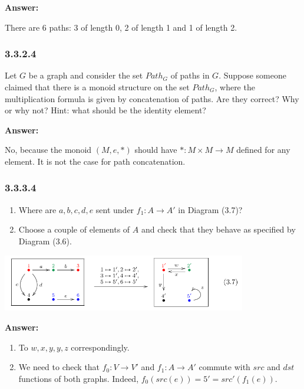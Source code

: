 \documentclass{article}
\newcommand{\vsp}[0]{\vspace*{10pt}\par}
\newcommand{\exercise}[1]{\subsubsection*{#1}}
\newcommand{\ans}[0]{\vsp\textbf{Answer: }\vsp}
\newcommand{\ei}{\item}
\newcommand{\es}{\begin{enumerate}[label=(\alph*)]\ei}
\newcommand{\ee}{\end{enumerate}}
\begin{document}
\ans

There are 6 paths: 3 of length 0, 2 of length 1 and 1 of length 2.

\exercise{3.3.2.4}

Let $G$ be a graph and consider the set $Path_G$ of paths in $G$. Suppose
someone claimed that there is a monoid structure on the set $Path_G$, where the
multiplication formula is given by concatenation of paths. Are they correct? Why
or why not? Hint: what should be the identity element?

\ans

No, because the monoid $(M,e,*)$ should have $*:M \times M\to M$ defined for any
element. It is not the case for path concatenation.

\exercise{3.3.3.4}

\es Where are $a, b, c, d, e$ sent under $f_1 : A \to A'$ in Diagram (3.7)?
\ei Choose a couple of elements of $A$ and check that they behave as specified
    by Diagram (3.6).
\ee

\begin{center}
\includegraphics[width=0.8\textwidth]{img/graph-homomorphism.png}
\end{center}

\ans

\es To $w, x, y, y, z$ correspondingly.
\ei We need to check that $f_0: V \to V'$ and $f_1:A \to A'$ commute with $src$
    and $dst$ functions of both graphs. Indeed, $f_0(src(e)) = 5' =
    src'(f_1(e))$.
\ee

\vsp
\vsp
\vsp
\vsp

\printbibliography
\end{document}
